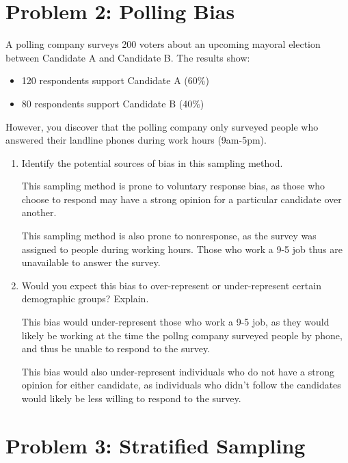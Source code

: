 \documentclass{article}
\begin{document}
\newpage

\section*{Problem 2: Polling Bias}

A polling company surveys 200 voters about an upcoming mayoral election between Candidate A and Candidate B. The results show:
\begin{itemize}
    \item 120 respondents support Candidate A (60\%)
    \item 80 respondents support Candidate B (40\%)
\end{itemize}

However, you discover that the polling company only surveyed people who answered their landline phones during work hours (9am-5pm).

\begin{enumerate}[label=(\alph*)]
    \item Identify the potential sources of bias in this sampling method.
    
    This sampling method is prone to voluntary response bias, as those who choose to respond may have a strong opinion for a particular candidate over another.

    This sampling method is also prone to nonresponse, as the survey was assigned to people during working hours. Those who work a 9-5 job thus are unavailable to answer the survey.
    

    \item Would you expect this bias to over-represent or under-represent certain demographic groups? Explain.

    This bias would under-represent those who work a 9-5 job, as they would likely be working at the time the pollng company surveyed people by phone, and thus be unable to respond to the survey.

    This bias would also under-represent individuals who do not have a strong opinion for either candidate, as individuals who didn't follow the candidates would likely be less willing to respond to the survey.
    \vspace{3cm}
\end{enumerate}

\newpage

\section*{Problem 3: Stratified Sampling}
\end{document}
